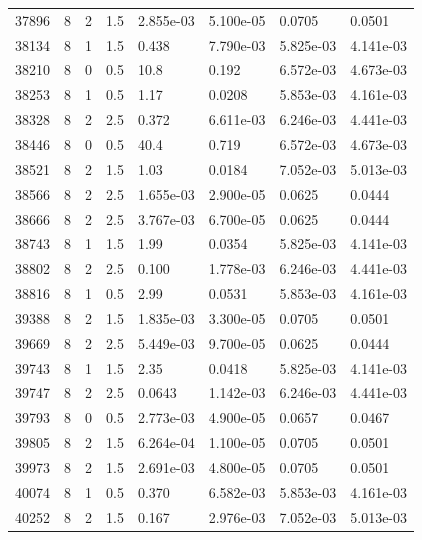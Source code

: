 \documentclass[preview]{standalone}
\begin{document}
{{{{{{{\begin{tabular}{L{1.2cm}C{1.2cm} C{0.3cm}C{0.5cm} C{1.4cm}C{1.4cm} C{1.4cm}C{1.4cm}}
  37896  &     8  & 2     & 1.5 &  2.855e-03  & 5.100e-05  & 0.0705 &  0.0501   \\ 
  38134  &     8  & 1     & 1.5 &  0.438  & 7.790e-03  & 5.825e-03 &  4.141e-03   \\ 
  38210  &     8  & 0     & 0.5 &  10.8  & 0.192  & 6.572e-03 &  4.673e-03   \\ 
  38253  &     8  & 1     & 0.5 &  1.17  & 0.0208  & 5.853e-03 &  4.161e-03   \\ 
  38328  &     8  & 2     & 2.5 &  0.372  & 6.611e-03  & 6.246e-03 &  4.441e-03   \\ 
  38446  &     8  & 0     & 0.5 &  40.4  & 0.719  & 6.572e-03 &  4.673e-03   \\ 
  38521  &     8  & 2     & 1.5 &  1.03  & 0.0184  & 7.052e-03 &  5.013e-03   \\ 
  38566  &     8  & 2     & 2.5 &  1.655e-03  & 2.900e-05  & 0.0625 &  0.0444   \\ 
  38666  &     8  & 2     & 2.5 &  3.767e-03  & 6.700e-05  & 0.0625 &  0.0444   \\ 
  38743  &     8  & 1     & 1.5 &  1.99  & 0.0354  & 5.825e-03 &  4.141e-03   \\ 
  38802  &     8  & 2     & 2.5 &  0.100  & 1.778e-03  & 6.246e-03 &  4.441e-03   \\ 
  38816  &     8  & 1     & 0.5 &  2.99  & 0.0531  & 5.853e-03 &  4.161e-03   \\ 
  39388  &     8  & 2     & 1.5 &  1.835e-03  & 3.300e-05  & 0.0705 &  0.0501   \\ 
  39669  &     8  & 2     & 2.5 &  5.449e-03  & 9.700e-05  & 0.0625 &  0.0444   \\ 
  39743  &     8  & 1     & 1.5 &  2.35  & 0.0418  & 5.825e-03 &  4.141e-03   \\ 
  39747  &     8  & 2     & 2.5 &  0.0643  & 1.142e-03  & 6.246e-03 &  4.441e-03   \\ 
  39793  &     8  & 0     & 0.5 &  2.773e-03  & 4.900e-05  & 0.0657 &  0.0467   \\ 
  39805  &     8  & 2     & 1.5 &  6.264e-04  & 1.100e-05  & 0.0705 &  0.0501   \\ 
  39973  &     8  & 2     & 1.5 &  2.691e-03  & 4.800e-05  & 0.0705 &  0.0501   \\ 
  40074  &     8  & 1     & 0.5 &  0.370  & 6.582e-03  & 5.853e-03 &  4.161e-03   \\ 
  40252  &     8  & 2     & 1.5 &  0.167  & 2.976e-03  & 7.052e-03 &  5.013e-03   \\ 

\end{tabular}}}}}}}}
\end{document}

